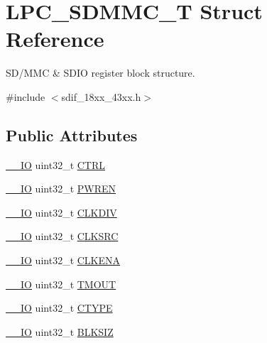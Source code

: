 \hypertarget{struct_l_p_c___s_d_m_m_c___t}{}\section{L\+P\+C\+\_\+\+S\+D\+M\+M\+C\+\_\+T Struct Reference}
\label{struct_l_p_c___s_d_m_m_c___t}


S\+D/\+M\+MC \& S\+D\+IO register block structure.  




{\ttfamily \#include $<$sdif\+\_\+18xx\+\_\+43xx.\+h$>$}

\subsection*{Public Attributes}
\begin{DoxyCompactItemize}
\item 
\hyperlink{core__sc300_8h_aec43007d9998a0a0e01faede4133d6be}{\+\_\+\+\_\+\+IO} uint32\+\_\+t \hyperlink{struct_l_p_c___s_d_m_m_c___t_a2fbfe51e11aa29e544779fde6ed3efcc}{C\+T\+RL}
\item 
\hyperlink{core__sc300_8h_aec43007d9998a0a0e01faede4133d6be}{\+\_\+\+\_\+\+IO} uint32\+\_\+t \hyperlink{struct_l_p_c___s_d_m_m_c___t_a3add899c23e19943d9bb861e82674a43}{P\+W\+R\+EN}
\item 
\hyperlink{core__sc300_8h_aec43007d9998a0a0e01faede4133d6be}{\+\_\+\+\_\+\+IO} uint32\+\_\+t \hyperlink{struct_l_p_c___s_d_m_m_c___t_a99aeeb0c8295abf54c9d3edbc3dce2f8}{C\+L\+K\+D\+IV}
\item 
\hyperlink{core__sc300_8h_aec43007d9998a0a0e01faede4133d6be}{\+\_\+\+\_\+\+IO} uint32\+\_\+t \hyperlink{struct_l_p_c___s_d_m_m_c___t_acee37fc97f323d4690407086a1634e1a}{C\+L\+K\+S\+RC}
\item 
\hyperlink{core__sc300_8h_aec43007d9998a0a0e01faede4133d6be}{\+\_\+\+\_\+\+IO} uint32\+\_\+t \hyperlink{struct_l_p_c___s_d_m_m_c___t_a987dfd7301dc03ee1d6cca4605eab8d6}{C\+L\+K\+E\+NA}
\item 
\hyperlink{core__sc300_8h_aec43007d9998a0a0e01faede4133d6be}{\+\_\+\+\_\+\+IO} uint32\+\_\+t \hyperlink{struct_l_p_c___s_d_m_m_c___t_a50ffd2ff08194cbaafdfe96a58a813df}{T\+M\+O\+UT}
\item 
\hyperlink{core__sc300_8h_aec43007d9998a0a0e01faede4133d6be}{\+\_\+\+\_\+\+IO} uint32\+\_\+t \hyperlink{struct_l_p_c___s_d_m_m_c___t_a90b46bdd4bcf06d7f722a35c07113346}{C\+T\+Y\+PE}
\item 
\hyperlink{core__sc300_8h_aec43007d9998a0a0e01faede4133d6be}{\+\_\+\+\_\+\+IO} uint32\+\_\+t \hyperlink{struct_l_p_c___s_d_m_m_c___t_a66f261cc56afffc8214127f088645bb7}{B\+L\+K\+S\+IZ}

\end{DoxyCompactItemize}

